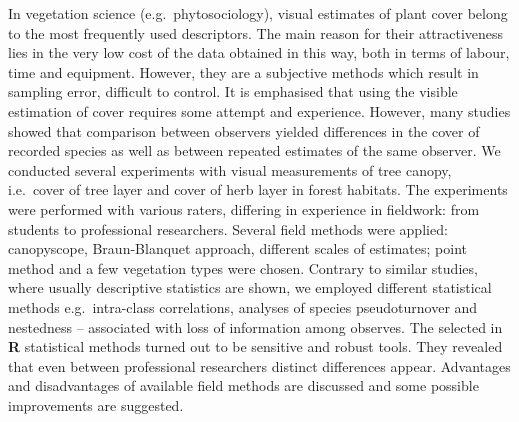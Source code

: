 \documentclass[\main/boa.tex]{subfiles}
\begin{document}
In vegetation science (e.g.~phytosociology), visual estimates of plant
cover belong to the most frequently used descriptors. The main reason
for their attractiveness lies in the very low cost of the data obtained
in this way, both in terms of labour, time and equipment. However, they
are a subjective methods which result in sampling error, difficult to
control. It is emphasised that using the visible estimation of cover
requires some attempt and experience. However, many studies showed that
comparison between observers yielded differences in the cover of
recorded species as well as between repeated estimates of the same
observer. We conducted several experiments with visual measurements of
tree canopy, i.e.~cover of tree layer and cover of herb layer in forest
habitats. The experiments were performed with various raters, differing
in experience in fieldwork: from students to professional researchers.
Several field methods were applied: canopyscope, Braun-Blanquet
approach, different scales of estimates; point method and a few
vegetation types were chosen. Contrary to similar studies, where usually
descriptive statistics are shown, we employed different statistical
methods e.g.~intra-class correlations, analyses of species
pseudoturnover and nestedness -- associated with loss of information
among observes. The selected in \textbf{R} statistical methods turned
out to be sensitive and robust tools. They revealed that even between
professional researchers distinct differences appear. Advantages and
disadvantages of available field methods are discussed and some possible
improvements are suggested.
\end{document}
